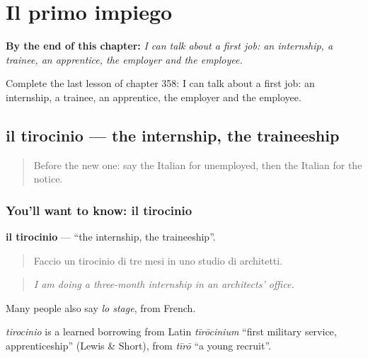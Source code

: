 
\chapter{Il primo impiego}
\label{ch:it-il-primo-impiego}

\begin{chapteropening}
\textbf{By the end of this chapter:} \emph{I can talk about a first job: an internship, a trainee, an apprentice, the employer and the employee.}

Complete the last lesson of chapter 358: I can talk about a first job: an internship, a trainee, an apprentice, the employer and the employee.
\end{chapteropening}

\section[il tirocinio]{il tirocinio — the internship, the traineeship}

\label{lesson:IT-C358-tirocinio}



\begin{quote}
Before the new one: say the Italian for unemployed, then the Italian for the notice.
\end{quote}

\subsection*{You'll want to know: il tirocinio}
\textbf{il tirocinio} — \textquotedblleft{}the internship, the traineeship\textquotedblright{}.

\begin{quote}
Faccio un tirocinio di tre mesi in uno studio di architetti.
\end{quote}

\begin{quote}
\emph{I am doing a three-month internship in an architects' office.}
\end{quote}

Many people also say \emph{lo stage}, from French.

\begin{cousinweb}
\emph{tirocinio} is a learned borrowing from Latin \emph{tīrōcinium} \textquotedblleft{}first military service, apprenticeship\textquotedblright{} (Lewis \& Short), from \emph{tīrō} \textquotedblleft{}a young recruit\textquotedblright{}.
\end{cousinweb}

